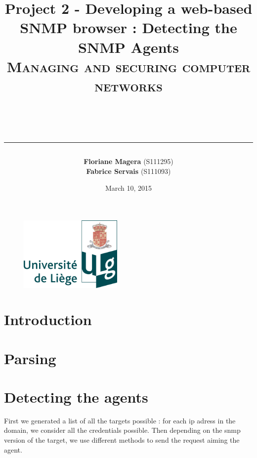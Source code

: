 \documentclass[a4paper,titlepage]{article}
\begin{document}
\begin{titlepage}

\begin{figure}
\centering
\includegraphics[width=5cm]{logo-ulg.png}
\end{figure}



\title{
\vspace{0.2cm}
\LARGE{\textbf{Project 2 - Developing a web-based SNMP browser : Detecting the SNMP Agents}} \\ \textsc{Managing and securing computer networks}
\author{\textbf{Floriane Magera} \small{(S111295})\\\textbf{Fabrice Servais} \small{(S111093})}\\
\date{March 10, 2015}
\rule{15cm}{1.5pt}
}

\end{titlepage}

\pagestyle{fancy}

\maketitle


\section{Introduction}




\section{Parsing}





\section{Detecting the agents}
First we generated a list of all the targets possible : for each ip adress in the domain, we consider all the credentials possible.  Then depending on the snmp version of the target, we use different methods to send the request aiming the agent. 
	
\end{document}
